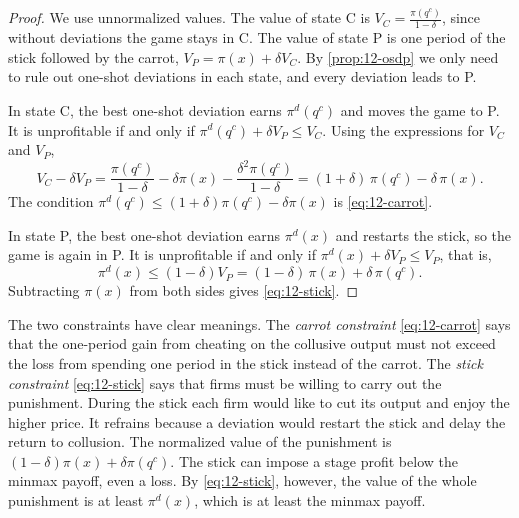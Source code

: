 \begin{proof}
We use unnormalized values. The value of state C is $V_C = \frac{\pi(q^c)}{1 - \delta}$, since without deviations the
game stays in C. The value of state P is one period of the stick followed by the carrot, $V_P = \pi(x) + \delta V_C$.
By \cref{prop:12-osdp} we only need to rule out one-shot deviations in each state, and every deviation leads to P.

In state C, the best one-shot deviation earns $\pi^d(q^c)$ and moves the game to P. It is unprofitable if and only if
$\pi^d(q^c) + \delta V_P \le V_C$. Using the expressions for $V_C$ and $V_P$,
\begin{equation*}
V_C - \delta V_P = \frac{\pi(q^c)}{1 - \delta} - \delta\pi(x) - \frac{\delta^2\pi(q^c)}{1 - \delta}
= (1 + \delta)\,\pi(q^c) - \delta\,\pi(x) .
\end{equation*}
The condition $\pi^d(q^c) \le (1 + \delta)\pi(q^c) - \delta\pi(x)$ is \eqref{eq:12-carrot}.

In state P, the best one-shot deviation earns $\pi^d(x)$ and restarts the stick, so the game is again in P. It is
unprofitable if and only if $\pi^d(x) + \delta V_P \le V_P$, that is,
\begin{equation*}
\pi^d(x) \le (1 - \delta)V_P = (1 - \delta)\,\pi(x) + \delta\,\pi(q^c) .
\end{equation*}
Subtracting $\pi(x)$ from both sides gives \eqref{eq:12-stick}.
\end{proof}

The two constraints have clear meanings. The \emph{carrot constraint} \eqref{eq:12-carrot} says that the one-period
gain from cheating on the collusive output must not exceed the loss from spending one period in the stick instead of
the carrot. The \emph{stick constraint} \eqref{eq:12-stick} says that firms must be willing to carry out the
punishment. During the stick each firm would like to cut its output and enjoy the higher price. It refrains because a
deviation would restart the stick and delay the return to collusion. The normalized value of the punishment is
$(1 - \delta)\pi(x) + \delta\pi(q^c)$. The stick can impose a stage profit below the minmax payoff, even a loss. By
\eqref{eq:12-stick}, however, the value of the whole punishment is at least $\pi^d(x)$, which is at least the minmax
payoff.

